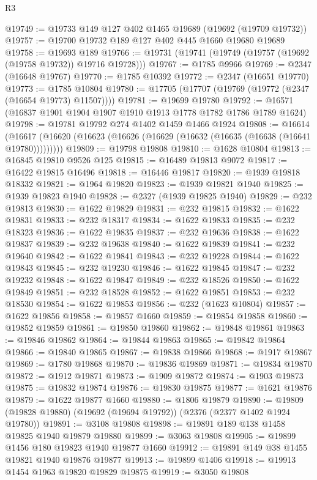 \begin{lexlean}{R3}
\begin{coremodule}
@19749 := @19733 @149 @127 @402 @1465 @19689 (@19692 (@19709 @19732))
@19757 := @19700 @19732 @189 @127 @402 @445 @1660 @19680 @19689
@19758 := @19693 @189
@19766 := @19731 (@19741 (@19749 (@19757 (@19692 (@19758 @19732)) @19716 @19728)))
@19767 := @1785 @9966
@19769 := @2347 (@16648 @19767)
@19770 := @1785 @10392
@19772 := @2347 (@16651 @19770)
@19773 := @1785 @10804
@19780 := @17705 (@17707 (@19769 (@19772 (@2347 (@16654 @19773) @11507))))
@19781 := @19699 @19780
@19792 := @16571 (@16837 @1901 @1904 @1907 @1910 @1913 @1778 @1782 @1786 @1789 @1624)
@19798 := @19781 @19792 @274 @1402 @1459 @1466 @1924
@19808 := @16614
    (@16617 (@16620 (@16623 (@16626 (@16629 (@16632 (@16635 (@16638 (@16641 @19780)))))))))
@19809 := @19798 @19808
@19810 := @1628 @10804
@19813 := @16845 @19810 @9526 @125
@19815 := @16489 @19813 @9072
@19817 := @16422 @19815 @16496
@19818 := @16446 @19817
@19820 := @1939 @19818 @18332
@19821 := @1964 @19820
@19823 := @1939 @19821 @1940
@19825 := @1939 @19823 @1940
@19828 := @2327 (@1939 @19825 @1940)
@19829 := @232 @19813
@19830 := @1622 @19829
@19831 := @232 @19815
@19832 := @1622 @19831
@19833 := @232 @18317
@19834 := @1622 @19833
@19835 := @232 @18323
@19836 := @1622 @19835
@19837 := @232 @19636
@19838 := @1622 @19837
@19839 := @232 @19638
@19840 := @1622 @19839
@19841 := @232 @19640
@19842 := @1622 @19841
@19843 := @232 @19228
@19844 := @1622 @19843
@19845 := @232 @19230
@19846 := @1622 @19845
@19847 := @232 @19232
@19848 := @1622 @19847
@19849 := @232 @18526
@19850 := @1622 @19849
@19851 := @232 @18528
@19852 := @1622 @19851
@19853 := @232 @18530
@19854 := @1622 @19853
@19856 := @232 (@1623 @10804)
@19857 := @1622 @19856
@19858 := @19857 @1660
@19859 := @19854 @19858
@19860 := @19852 @19859
@19861 := @19850 @19860
@19862 := @19848 @19861
@19863 := @19846 @19862
@19864 := @19844 @19863
@19865 := @19842 @19864
@19866 := @19840 @19865
@19867 := @19838 @19866
@19868 := @1917 @19867
@19869 := @1780 @19868
@19870 := @19836 @19869
@19871 := @19834 @19870
@19872 := @1912 @19871
@19873 := @1909 @19872
@19874 := @1903 @19873
@19875 := @19832 @19874
@19876 := @19830 @19875
@19877 := @1621 @19876
@19879 := @1622 @19877 @1660
@19880 := @1806 @19879
@19890 := @19809 (@19828 @19880) (@19692 (@19694 @19792)) (@2376 (@2377 @1402 @1924 @19780))
@19891 := @3108 @19808
@19898 := @19891 @189 @138 @1458 @19825 @1940 @19879 @19880
@19899 := @3063 @19808
@19905 := @19899 @1456 @180 @19823 @1940 @19877 @1660
@19912 := @19891 @149 @38 @1455 @19821 @1940 @19876 @19877
@19913 := @19899 @1406
@19918 := @19913 @1454 @1963 @19820 @19829 @19875
@19919 := @3050 @19808

\end{coremodule}
\end{lexlean}
